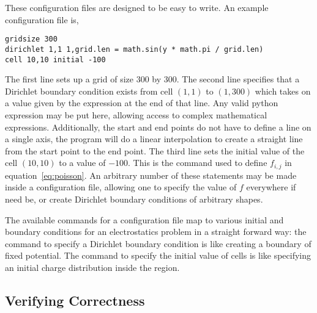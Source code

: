These configuration files are designed to be easy to write. An example configuration file is,
\begin{addmargin}[4em]{2em}
\begin{singlespace}
\texttt{gridsize 300}\\
\texttt{dirichlet 1,1 1,grid.len = math.sin(y * math.pi / grid.len)}\\
\texttt{cell 10,10 initial -100}
\end{singlespace}
\end{addmargin}
The first line sets up a grid of size 300 by 300. The second line specifies that a Dirichlet boundary condition exists
from cell $(1, 1)$ to $(1, 300)$ which takes on a value given by the expression at the end of that line. Any valid python
expression may be put here, allowing access to complex mathematical expressions. Additionally, the start and end points
do not have to define a line on a single axis, the program will do a linear interpolation to create a straight line from
	the start point to the end point.
The third line sets the initial value of
the cell $(10, 10)$ to a value of $-100$. This is the command used to define $f_{i,j}$ in equation~\ref{eq:poisson}.
An arbitrary number of these statements may be made inside a configuration file, allowing one to specify the value of
$f$ everywhere if need be, or create Dirichlet boundary conditions of arbitrary shapes.

The available commands for a configuration file map to various initial and boundary conditions for an electrostatics problem
in a straight forward way: the command to specify a Dirichlet boundary condition is like creating a boundary of fixed potential.
The command to specify the initial value of cells is like specifying an initial charge distribution inside the region.












\subsection{Verifying Correctness}

